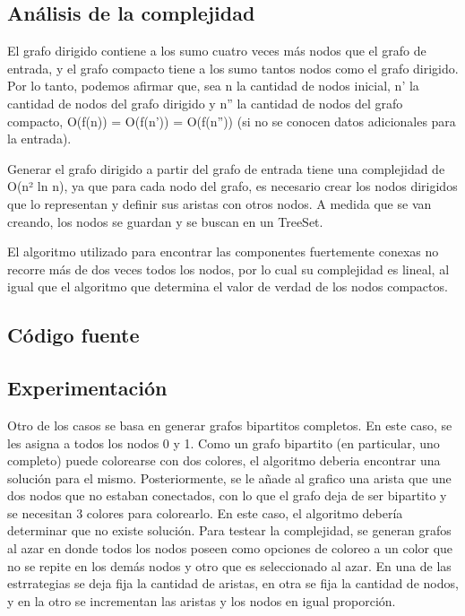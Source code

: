 \subsection{Análisis de la complejidad}
El grafo dirigido contiene a los sumo cuatro veces más nodos que el grafo de entrada, y el grafo compacto tiene a los sumo tantos nodos como el grafo dirigido. Por lo tanto, podemos afirmar que, sea n la cantidad de nodos inicial, n' la cantidad de nodos del grafo dirigido y n'' la cantidad de nodos del grafo compacto, O(f(n)) =  O(f(n')) = O(f(n'')) (si no se conocen datos adicionales para la entrada).

Generar el grafo dirigido a partir del grafo de entrada tiene una complejidad de O(n² ln n), ya que para cada nodo del grafo, es necesario crear los nodos dirigidos que lo representan y definir sus aristas con otros nodos. A medida que se van creando, los nodos se guardan y se buscan en un TreeSet.

El algoritmo utilizado para encontrar las componentes fuertemente conexas no recorre más de dos veces todos los nodos, por lo cual su complejidad es lineal, al igual que el algoritmo que determina el valor de verdad de los nodos compactos.

\subsection{Código fuente}

% 
% 
% 

\subsection{Experimentación}


Otro de los casos se basa en generar grafos bipartitos completos. En este caso, se les asigna a todos los nodos 0 y 1. Como un grafo bipartito (en particular, uno completo) puede colorearse con dos colores, el algoritmo deberia encontrar una solución para el mismo. Posteriormente, se le añade al grafico una arista que une dos nodos que no estaban conectados, con lo que el grafo deja de ser bipartito y se necesitan 3 colores para colorearlo. En este caso, el algoritmo debería determinar que no existe solución.
Para testear la complejidad, se generan grafos al azar en donde todos los nodos poseen como opciones de coloreo a un color que no se repite en los demás nodos y otro que es seleccionado al azar. En una de las estrrategias se deja fija la cantidad de aristas, en otra se fija la cantidad de nodos, y en la otro se incrementan las aristas y los nodos en igual proporción.


